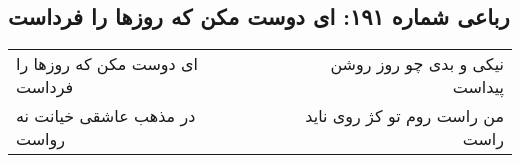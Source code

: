 \begin{center}
\section*{رباعی شماره ۱۹۱: ای دوست مکن که روزها را فرداست}
\label{sec:0191}
\begin{longtable}{l p{0.5cm} r}
ای دوست مکن که روزها را فرداست
&&
نیکی و بدی چو روز روشن پیداست
\\
در مذهب عاشقی خیانت نه رواست
&&
من راست روم تو کژ روی ناید راست
\\
\end{longtable}
\end{center}
